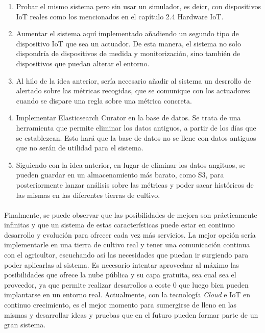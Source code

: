 \documentclass[../../memoria.tex]{subfiles}
\begin{document}
\begin{enumerate}
    \item Probar el mismo sistema pero sin usar un simulador, es deicr, con dispositivos IoT reales como los mencionados en el capítulo 2.4 Hardware IoT.
    \item Aumentar el sistema aquí implementado añadiendo un segundo tipo de dispositivo IoT que sea un actuador. De esta manera, el sistema no solo dispondría de dispositivos de medida y monitorización, sino también de dispositivos que puedan alterar el entorno.
    \item Al hilo de la idea anterior, sería necesario añadir al sistema un desrrollo de alertado sobre las métricas recogidas, que se comunique con los actuadores cuando se dispare una regla sobre una métrica concreta.
    \item Implementar Elasticsearch Curator \cite{elasticsearchcurator} en la base de datos. Se trata de una herramienta que permite eliminar los datos antiguos, a partir de los días que se establezcan. Esto hará que la base de datos no se llene con datos antiguos que no serán de utilidad para el sistema.
    \item Siguiendo con la idea anterior, en lugar de eliminar los datos angituos, se pueden guardar en un almacenamiento más barato, como S3, para posteriormente lanzar análisis sobre las métricas y poder sacar históricos de las mismas en las diferentes tierras de cultivo.
\end{enumerate}

\paragraph{}
Finalmente, se puede observar que las posibilidades de mejora son prácticamente infinitas y que un sistema de estas características puede estar en continuo desarrollo y evolución para ofrecer cada vez más servicios. La mejor opción sería implementarle en una tierra de cultivo real y tener una comunicación continua con el agricultor, escuchando así las necesidades que puedan ir surgiendo para poder aplicarlas al sistema. Es necesario intentar aprovechar al máximo las posibilidades que ofrece la nube pública y su capa gratuita, sea cual sea el proveedor, ya que permite realizar desarrollos a coste 0 que luego bien pueden implantarse en un entorno real. Actualmente, con la tecnología \textit{Cloud} e IoT en continuo crecimiento, es el mejor momento para sumergirse de lleno en las mismas y desarrollar ideas y pruebas que en el futuro pueden formar parte de un gran sistema.
\end{document}
